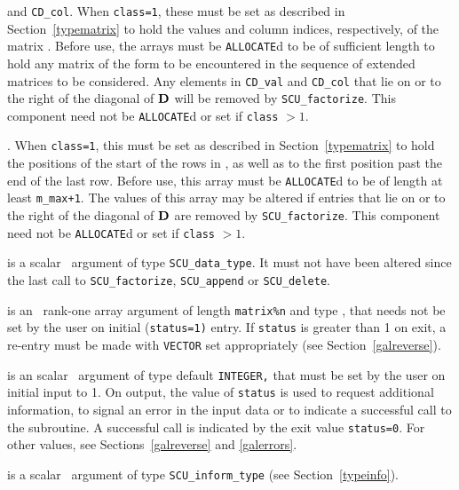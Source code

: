 \documentclass{galahad}
\newcommand{\packagename}{SCU}
\begin{document}
\begin{description}
\begin{description}
 and {\tt CD\_col}.
When {\tt class=1},
these must be set as described in Section~\ref{typematrix} to hold the
values and column indices, respectively, of the matrix .
Before use, the arrays must be {\tt ALLOCATE}d
to be of sufficient length to hold any matrix of the form 
to be encountered in the sequence of
extended matrices to be considered. Any elements in
{\tt CD\_val} and {\tt CD\_col}
that lie on or to the right of the diagonal of ${\mathbf{D}}$ will be removed by
{\tt \packagename\_factorize}.
This component need not be {\tt ALLOCATE}d or set if {\tt class} $> 1$.

. When {\tt class=1},
this must be set as described in Section~\ref{typematrix} to hold the
positions of the start of the rows in , as well as to the first
position past the end of the last row.
Before use, this array must be {\tt ALLOCATE}d to be of length at least
{\tt m\_max+1}.
The values of this array may be altered if entries that lie on or to the
right of the diagonal of ${\mathbf{D}}$ are removed by {\tt \packagename\_factorize}.
This component need not be {\tt ALLOCATE}d or set if {\tt class} $> 1$.

\end{description}

 is a scalar \intentinout\ argument of type
{\tt \packagename\_data\_type}.
It must not have been altered since the last call to
{\tt \packagename\_factorize},
{\tt \packagename\_append} or
{\tt \packagename\_delete}.

 is an \intentinout\ rank-one array argument of length
{\tt matrix\%n}
and type \realdp,
that needs not be set by
the user on initial ({\tt status=1)} entry. If {\tt status} is greater than
1 on exit, a re-entry must be made with {\tt VECTOR} set appropriately
(see Section~\ref{galreverse}).

 is an scalar \intentinout\ argument of type
default {\tt INTEGER,} that
must be set by the user on initial input to 1. On output, the value of
{\tt status}
is used to request additional information, to signal an error
in the input data or to indicate a successful call to the subroutine.
A successful call is indicated by the exit value {\tt status=0}.
For other values, see Sections~\ref{galreverse} and \ref{galerrors}.

 is a scalar \intentinout\ argument of type
{\tt \packagename\_inform\_type}
(see Section~\ref{typeinfo}).

\end{description}
\end{document}
